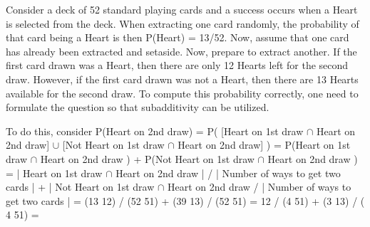 \documentclass[10pt,]{book}
\theoremstyle{plain}
\theoremstyle{definition}
\theoremstyle{definition}
\theoremstyle{definition}
\numberwithin{equation}{section}
\begin{document}
	Consider a deck of 52 standard playing cards and a success occurs when a Heart is selected from the deck. When extracting one card randomly, the probability	of that card being a Heart is then P(Heart) = 13/52. Now, assume that one card has already been extracted and setaside.  Now, prepare to extract another. If the first card drawn was a Heart, then there are only 12 Hearts left for the second draw. However, if the first card drawn was not a Heart, then there are 13 Hearts available for the second draw. To compute this probability correctly, one need to formulate the question so that subadditivity can  be utilized.%
\par

	To do this, consider 
	P(Heart on 2nd draw) 
	= P( [Heart on 1st draw \(\cap\) Heart on 2nd draw] \(\cup\) [Not Heart on 1st draw \(\cap\) Heart on 2nd draw] )
	= P(Heart on 1st draw \(\cap\) Heart on 2nd draw ) + P(Not Heart on 1st draw \(\cap\) Heart on 2nd draw )
	= | Heart on 1st draw \(\cap\) Heart on 2nd draw | / | Number of ways to get two cards |
	+ | Not Heart on 1st draw \(\cap\) Heart on 2nd draw / | Number of ways to get two cards |
	= (13 12) / (52 51) + (39 13) / (52 51) = 12 / (4 51) + (3 13) / ( 4 51) =  
\end{document}
